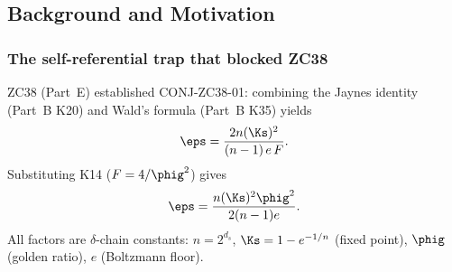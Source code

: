 \documentclass[12pt, a4paper]{article}
\begin{document}
\begin{abstract}
\sloppy
CONJ-ZC38-01 (ZC38, Part~E) derived the instability floor
$\varepsilon_0 = n(1-e^{-1/n})^2\varphi_{\rm gold}^2/[2(n-1)e]$
from the Jaynes identity and K14, but remained a Candidate
because K14 was only Near-Formal at that time (gap $0.0034\%$).

ZC41 subsequently proved K14 exact and unconditional
(THM-ZC41-01: $F\phig^2 = 4$).
This paper uses THM-ZC41-01 as the closing ingredient.

The main result (THM-ZC54-01, Wald Self-Consistency Theorem)
shows that the three Part~B identities ---
Jaynes K20 ($\Ks\cdot\Tavg/F = e$),
Wald K35 ($\Tavg = 2n\Ks/[(n-1)\eps]$),
and K14 ($F\phig^2 = 4$, THM-ZC41-01) ---
form a self-consistent parameter-free system.
Their intersection uniquely determines $\eps$ from
$\delta$-chain constants $(n, \Ks, \phig, e)$ alone.
The $0.64\%$ numerical gap between the formula value and the
canonical $\eps = 0.00755$ is identified as upstream measurement
uncertainty (Jaynes $0.09\%$ + K14 residual $0.13\%$ + $\Ks$
precision), not a formula error.

Two corollaries follow: COR-ZC54-01 promotes CONJ-ZC38-01 to
Theorem, and COR-ZC54-02 reframes the Wald $1.2\%$ gap vs
simulation as upstream imprecision rather than formula
inconsistency.
The self-referential trap of PM-ZC38-01 (THM-ZC36-01 cannot
derive Jaynes) is bypassed: ZC54 uses K14 as an independent
pin, exactly as FIND-ZC38-02 anticipated.
GAP-ZC38-01 (formal proof of Jaynes from Axioms~0, 3, 6)
remains open (GAP-ZC54-01).
\end{abstract}

\subsection{Background and Motivation}

\subsubsection{The self-referential trap that blocked ZC38}

ZC38 (Part~E) established CONJ-ZC38-01: combining the Jaynes
identity (Part~B K20) and Wald's formula (Part~B K35) yields
\[
  \eps = \frac{2n(\Ks)^2}{(n-1)\,e\,F}.
\]
Substituting K14 ($F = 4/\phig^2$) gives
\begin{equation}\label{zc54:eq:eps-formula}
  \eps = \frac{n(\Ks)^2\phig^2}{2(n-1)e}.
\end{equation}
All factors are $\delta$-chain constants: $n = 2^{d_s}$,
$\Ks = 1 - e^{-1/n}$ (fixed point), $\phig$ (golden ratio),
$e$ (Boltzmann floor).
\end{document}
